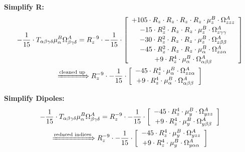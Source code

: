 \documentclass{article}
\begin{document}
\textbf{Simplify R:}
\begin{subequations}\begin{gather}
- \frac{1}{15} \cdot T_{\alpha{}\beta{}\gamma{}\delta{}} \mu{}^{B}_{\alpha{}} \Omega{}^{A}_{\beta{}\gamma{}\delta{}} = R_{z}^{-9} \cdot - \frac{1}{15} \cdot  \left[ \begin{array}{c} 
 		+ 105 \cdot R_{z} \cdot R_{z} \cdot R_{z} \cdot R_{z} \cdot \mu{}^{B}_{z} \cdot \Omega{}^{A}_{zzz} 
 \\[0.2em] 		 - 15 \cdot R_{z}^{2} \cdot R_{z} \cdot R_{z} \cdot \mu{}^{B}_{z} \cdot \Omega{}^{A}_{z\gamma{}\gamma{}} 
 \\[0.2em] 		 - 30 \cdot R_{z}^{2} \cdot R_{z} \cdot R_{z} \cdot \mu{}^{B}_{z} \cdot \Omega{}^{A}_{z\beta{}\beta{}} 
 \\[0.2em] 		 - 45 \cdot R_{z}^{2} \cdot R_{z} \cdot R_{z} \cdot \mu{}^{B}_{\alpha{}} \cdot \Omega{}^{A}_{zz\alpha{}} 
 \\[0.2em] 		 + 9 \cdot R_{z}^{4} \cdot \mu{}^{B}_{\alpha{}} \cdot \Omega{}^{A}_{\alpha{}\beta{}\beta{}}
 \end{array}\right] 
\\ \xRightarrow{\text{cleaned up}}
 R_{z}^{-9} \cdot - \frac{1}{15} \cdot  \left[ \begin{array}{c} 
 		- 45 \cdot R_{z}^{4} \cdot \mu{}^{B}_{\alpha{}} \cdot \Omega{}^{A}_{zz\alpha{}} 
 \\[0.2em] 		 + 9 \cdot R_{z}^{4} \cdot \mu{}^{B}_{\alpha{}} \cdot \Omega{}^{A}_{\alpha{}\beta{}\beta{}}
 \end{array}\right] 
\end{gather}\end{subequations}


\textbf{Simplify Dipoles:}
\begin{subequations}\begin{gather}
- \frac{1}{15} \cdot T_{\alpha{}\beta{}\gamma{}\delta{}} \mu{}^{B}_{\alpha{}} \Omega{}^{A}_{\beta{}\gamma{}\delta{}} = R_{z}^{-9} \cdot - \frac{1}{15} \cdot  \left[ \begin{array}{c} 
 		- 45 \cdot R_{z}^{4} \cdot \mu{}^{B}_{y} \cdot \Omega{}^{A}_{yzz} 
 \\[0.2em] 		 + 9 \cdot R_{z}^{4} \cdot \mu{}^{B}_{y} \cdot \Omega{}^{A}_{y\beta{}\beta{}}
 \end{array}\right] 
\\ \xRightarrow{\text{reduced indices}}
 R_{z}^{-9} \cdot - \frac{1}{15} \cdot  \left[ \begin{array}{c} 
 		- 45 \cdot R_{z}^{4} \cdot \mu{}^{B}_{y} \cdot \Omega{}^{A}_{yzz} 
 \\[0.2em] 		 + 9 \cdot R_{z}^{4} \cdot \mu{}^{B}_{y} \cdot \Omega{}^{A}_{y\alpha{}\alpha{}}
 \end{array}\right] 
\end{gather}\end{subequations}
\end{document}
